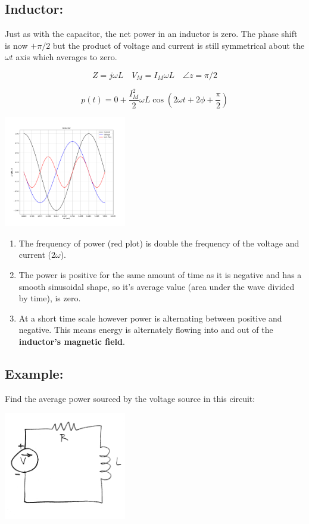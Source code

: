 \subsection*{Inductor:}

Just as with the capacitor, the net power in an inductor is zero.
The phase shift is now $+\pi/2$ but the product of voltage and current
is still symmetrical about the $\omega t$ axis which averages to zero.

\[
Z = j\omega L \quad V_M = I_M \omega L \quad \angle z = \pi/2
\]

\[
p(t) = 0 + \frac{I_M^2}{2} \omega L \cos(2\omega t + 2\phi + \frac{\pi}{2})
\]

\includegraphics[width=0.4\textwidth]{figsChapt03/LN19448.png}


\begin{enumerate}
    \item The frequency of power (red plot) is double the frequency of the voltage and current ($2\omega$).
    \item The power is positive for the same amount of time as it is
    negative and has a smooth sinusoidal shape, so it's average value
    (area under the wave divided by time), is zero.
    \item At a short time scale however power is alternating between
    positive and negative.  This means energy is alternately flowing
    into and out of the {\bf inductor's magnetic field}.
\end{enumerate}




\subsection*{Example:}


Find the average power sourced by the voltage source in this circuit:


\includegraphics[width=0.4\textwidth]{figsChapt03/TU95372.png}


